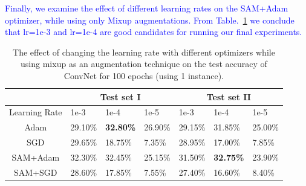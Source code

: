 \documentclass[a4paper,11pt]{article}
\begin{document}
\textcolor{blue}{Finally, we examine the effect of different learning rates on the SAM+Adam optimizer, while using only Mixup augmentations. From Table.~\ref{Table:learning_rates_convnet} we conclude that lr=1e-3 and lr=1e-4 are good candidates for running our final experiments.}

\begin{table}[h!]
\caption{The effect of changing the learning rate with different optimizers while using mixup as an augmentation technique on the test accuracy of ConvNet for 100 epochs (using 1 instance).}
\begin{center}
\begin{tabular}{|c|l|l|l|l|l|l|}
\hline
                                    & \multicolumn{3}{c|}{Test set I}      & \multicolumn{3}{c|}{Test set II}     \\ \hline
\multicolumn{1}{|l|}{Learning Rate} & 1e-3    & 1e-4             & 1e-5    & 1e-3    & 1e-4             & 1e-5    \\ \hline
Adam                                & 29.10\% & \textbf{32.80\%} & 26.90\% & 29.15\% & 31.85\%          & 25.00\% \\
SGD                                 & 29.65\% & 18.75\%          & 7.35\%  & 28.95\% & 17.00\%          & 7.85\%  \\
SAM+Adam                            & 32.30\% & 32.45\%          & 25.15\% & 31.50\% & \textbf{32.75\%} & 23.90\% \\
SAM+SGD                             & 28.60\% & 17.85\%          & 7.55\%  & 27.40\% & 16.60\%          & 8.40\%  \\ \hline
\end{tabular}
\end{center}
\label{Table:learning_rates_convnet}
\end{table}
\newpage
\end{document}
